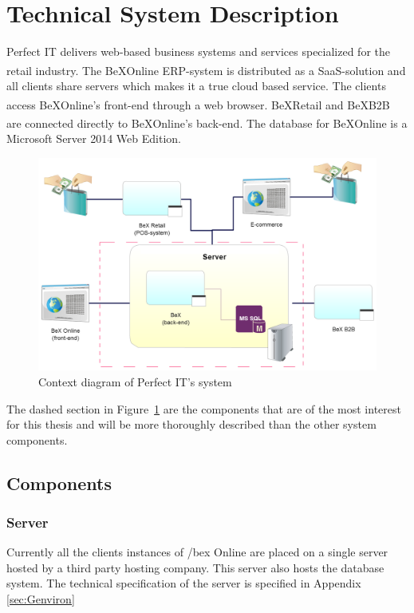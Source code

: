 \documentclass{cslthse-msc}
\newcommand{\bex}{BeX\textsuperscript{\textregistered}}
\begin{document}
\section{Technical System Description}
Perfect IT delivers web-based business systems and services specialized for the retail industry. The \bex Online ERP-system is distributed as a SaaS-solution and all clients share servers which makes it a true cloud based service. The clients access \bex Online's front-end through a web browser. \bex Retail and \bex B2B are connected directly to \bex Online's back-end.
The database for \bex Online is a Microsoft Server 2014 Web Edition.
\begin{figure}[H]
\vspace{-15pt}
  \begin{center}
    \includegraphics[scale=0.3]{Pictures/Systemdesc.png}
  \end{center}
  \caption{Context diagram of Perfect IT's system}
  \label{context}
  \vspace{-15pt}
\end{figure}
\noindent The dashed section in Figure~\ref{context} are the components that are of the most interest for this thesis and will be more thoroughly described than the other system components.

\subsection{Components}


\subsubsection{Server}
Currently all the clients instances of /bex Online are placed on a single server hosted by a third party hosting company. This server also hosts the database system.
The technical specification of the server is specified in Appendix \ref{sec:Genviron}
\end{document}
